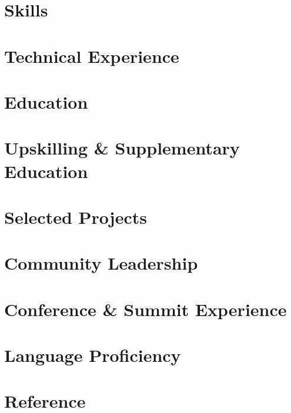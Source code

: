 \documentclass[letter,10pt]{article}
\begin{document}


\section{Skills}


\section{Technical Experience}


\section{Education}


\section{Upskilling \& Supplementary Education}



\section{Selected Projects}




\newpage

\section{Community Leadership}


\section{Conference \& Summit Experience}


\section{Language Proficiency}


\section{Reference}

\end{document}
